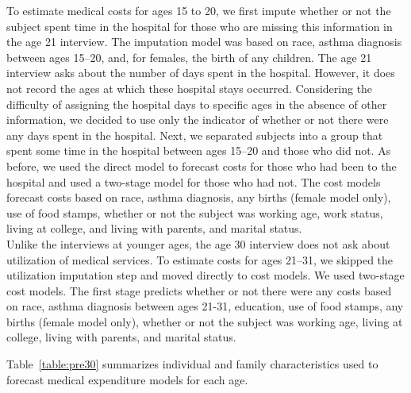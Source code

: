 \noindent To estimate medical costs for ages 15 to 20, we first impute whether or not the subject spent time in the hospital for those who are missing this information in the age 21 interview. The imputation model was based on race, asthma diagnosis between ages 15--20, and, for females, the birth of any children. The age 21 interview asks about the number of days spent in the hospital. However, it does not record the ages at which these hospital stays occurred. Considering the difficulty of assigning the hospital days to specific ages in the absence of other information, we decided to use only the indicator of whether or not there were any days spent in the hospital. Next, we separated subjects into a group that spent some time in the hospital between ages 15--20 and those who did not. As before, we used the direct model to forecast costs for those who had been to the hospital and used a two-stage model for those who had not. The cost models forecast costs based on race, asthma diagnosis, any births (female model only), use of food stamps, whether or not the subject was working age, work status, living at college, and living with parents, and marital status.\\

\noindent Unlike the interviews at younger ages, the age 30 interview does not ask about utilization of medical services. To estimate costs for ages 21--31, we skipped the utilization imputation step and moved directly to cost models. We used two-stage cost models. The first stage predicts whether or not there were any costs based on race, asthma diagnosis between ages 21-31, education, use of food stamps, any births (female model only), whether or not the subject was working age, living at college, living with parents, and marital status.

\noindent Table~\ref{table:pre30} summarizes individual and family characteristics used to forecast medical expenditure models for each age.

